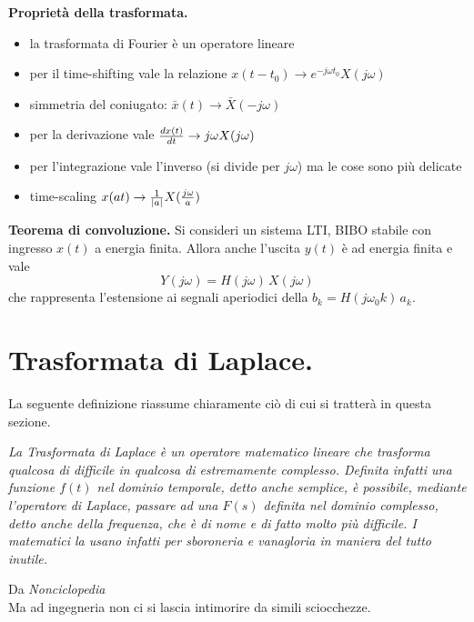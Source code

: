 \documentclass[a4paper,portrait,12pt]{article}
\theoremstyle{definition}
\begin{document}
\textbf{Proprietà della trasformata.}
\begin{itemize}
\item la trasformata di Fourier è un operatore lineare
\item per il time-shifting vale la relazione $x(t-t_0) \to e^{-j\omega t_0} X(j\omega)$
\item simmetria del coniugato: $\bar{x}(t) \to \bar{X}(-j\omega)$
\item per la derivazione vale ${d x(t) \over dt} \to j\omega X(j\omega)$
\item per l'integrazione vale l'inverso (si divide per $j\omega$) ma le cose sono più delicate
\item time-scaling $x(at ) \to {1\over \left|a\right|}X({j\omega \over a})$
\end{itemize} 
\bigskip

\textbf{Teorema di convoluzione.} Si consideri un sistema LTI, BIBO stabile con ingresso $x(t)$ a energia 
finita. Allora anche l'uscita $y(t)$ è ad energia finita e vale
\begin{equation}
\label{eqn:teoconv}
Y(j\omega) = H(j\omega)\,X(j\omega)
\end{equation}
che rappresenta l'estensione ai segnali aperiodici della $b_k = H(j\omega_0 k)\,a_k$.
\bigskip

\section{Trasformata di Laplace.}

La seguente definizione riassume chiaramente ciò di cui si tratterà in questa sezione.
\begin{displayquote} \textit{La Trasformata di Laplace è un operatore matematico lineare che trasforma 
qualcosa di difficile in qualcosa di estremamente complesso. Definita infatti una funzione $f(t)$ nel 
dominio temporale, detto anche semplice, è possibile, mediante l'operatore di Laplace, passare ad una $F(s)$ 
definita nel dominio complesso, detto anche della frequenza, che è di nome e di fatto molto più difficile. 
I matematici la usano infatti per sboroneria e vanagloria in maniera del tutto inutile.}
\end{displayquote}
\hfill Da \textit{Nonciclopedia}\\
Ma ad ingegneria non ci si lascia intimorire da simili sciocchezze.
\bigskip
\end{document}
